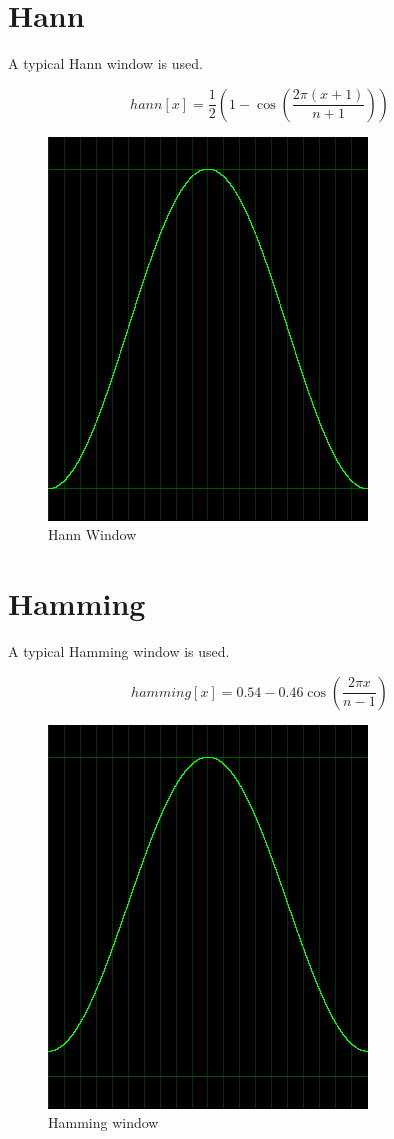 \documentclass[10pt,a4paper]{report}
\begin{document}
\begin{appendices}
\newpage
\section{Hann}
A typical Hann window is used.

\begin{equation}
hann[x] = \frac{1}{2}(1 - \cos(\frac{2\pi(x+1)}{n+1}))
\end{equation}

\begin{figure}[H]
	\centering
	\includegraphics[width=0.4\linewidth]{plots/window-hann.png}
	\caption[Hann Window]{Hann Window}
	\label{fig:window-hann}
\end{figure}

\newpage
\section{Hamming}
A typical Hamming window is used.

\begin{equation}
hamming[x] = 0.54 - 0.46\cos(\frac{2\pi x}{n-1})
\end{equation}

\begin{figure}[H]
	\centering
	\includegraphics[width=0.4\linewidth]{plots/window-hamming.png}
	\caption[Hamming window]{Hamming window}
	\label{fig:window-hamming}
\end{figure}



\end{appendices}
\end{document}
